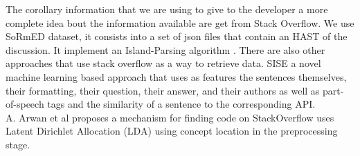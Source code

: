\documentclass[]{usiinfbachelorproject}
\begin{document}
The corollary information that we are using to give to the developer a more complete idea bout the information available are get from Stack Overflow. We use SoRmED dataset, it consists into a set of json files that contain an HAST of the discussion. It implement an Island-Parsing algorithm \cite{stormy}. There are also other approaches that use stack overflow as a  way to retrieve data.
SISE \cite{SISE}  a novel machine learning based approach that uses as features the sentences themselves, their formatting, their question, their answer, and their authors as well as part-of-speech tags and the similarity of a sentence to the corresponding API.\\
A. Arwan et al \cite{7231439}  proposes a mechanism for finding code on StackOverflow uses Latent Dirichlet Allocation (LDA) using concept location in the preprocessing stage. 
 



\end{document}
